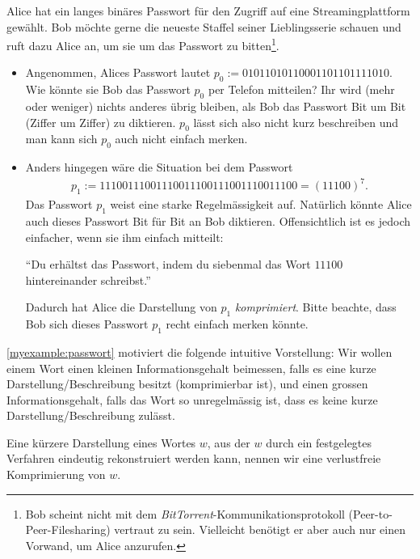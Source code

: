 \begin{myexample}\label{myexample:passwort}
Alice hat ein langes binäres Passwort für den Zugriff auf eine Streamingplattform gewählt.
Bob möchte gerne die neueste Staffel seiner Lieblingsserie schauen und ruft dazu Alice an, um sie um das Passwort zu bitten\footnote{Bob scheint nicht mit dem \textit{BitTorrent}-Kommunikationsprotokoll (Peer-to-Peer-Filesharing) vertraut zu sein.
	Vielleicht benötigt er aber auch nur einen Vorwand, um Alice anzurufen.}.

\begin{itemize}
	\item Angenommen, Alices Passwort lautet $p_0 := 01011010110001101101111010$. Wie könnte sie Bob das Passwort $p_0$ per Telefon mitteilen? Ihr wird (mehr oder weniger) nichts anderes übrig bleiben, als Bob das Passwort Bit um Bit (Ziffer um Ziffer) zu diktieren. $p_0$ lässt sich also nicht kurz beschreiben und man kann sich $p_0$ auch nicht einfach merken.
	\item Anders hingegen wäre die Situation bei dem Passwort
	      \begin{align*}
		      p_1 := 11100111001110011100111001110011100 = (11100)^7.
	      \end{align*}
	      Das Passwort $p_1$ weist eine starke Regelmässigkeit auf. Natürlich könnte Alice auch dieses Passwort Bit für Bit an Bob diktieren. Offensichtlich ist es jedoch einfacher, wenn sie ihm einfach mitteilt:
	      \begin{center}
		      \enquote{Du erhältst das Passwort, indem du siebenmal das Wort $11100$ hintereinander schreibst.}
	      \end{center}
	      Dadurch hat Alice die Darstellung von $p_1$ \textit{komprimiert}. Bitte beachte, dass Bob sich dieses Passwort $p_1$ recht einfach merken könnte.
\end{itemize}
\end{myexample}

\cref{myexample:passwort} motiviert die folgende intuitive Vorstellung: Wir wollen einem Wort einen kleinen Informationsgehalt beimessen, falls es eine kurze Darstellung/Beschreibung besitzt (komprimierbar ist), und
einen grossen Informationsgehalt, falls das Wort so unregelmässig ist, dass es keine kurze Darstellung/Beschreibung zulässt.

\begin{mydefinition}\label{mydefinition:Komprimierung}
Eine kürzere Darstellung eines Wortes $w$, aus der $w$ durch ein festgelegtes Verfahren eindeutig rekonstruiert werden kann, nennen wir eine verlustfreie Komprimierung von $w$.
\end{mydefinition}


